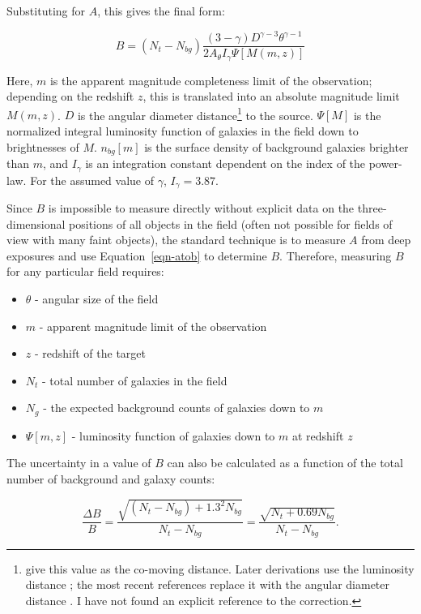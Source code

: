 \documentclass{emulateapj}
\begin{document}
Substituting for $A$, this gives the final form:

\begin{equation}
\label{eqn-bgb}
B = (N_t - N_{bg})\frac{(3-\gamma) D^{\gamma-3} \theta^{\gamma-1}}{2 A_\theta I_\gamma \Psi[M(m,z)]}
\end{equation}

\noindent Here, $m$ is the apparent magnitude completeness limit of the observation; depending on the redshift $z$, this is translated into an absolute magnitude limit $M(m,z)$. $D$ is the angular diameter distance\footnote{\citet{lon79} give this value as the co-moving distance. Later derivations use the luminosity distance \citep[eg,][]{yee87,ell91}; the most recent references replace it with the angular diameter distance \citep{yee99,muz07,zau07}. I have not found an explicit reference to the correction.} to the source. $\Psi[M]$ is the normalized integral luminosity function of galaxies in the field down to brightnesses of $M$. $n_{bg}[m]$ is the surface density of background galaxies brighter than $m$, and $I_\gamma$ is an integration constant dependent on the index of the power-law. For the assumed value of $\gamma$, $I_\gamma=3.87$.  

Since $B$ is impossible to measure directly without explicit data on the three-dimensional positions of all objects in the field (often not possible for fields of view with many faint objects), the standard technique is to measure $A$ from deep exposures and use Equation~\ref{eqn-atob} to determine $B$. Therefore, measuring $B$ for any particular field requires:

\begin{itemize}
    \item $\theta$ - angular size of the field
    \item $m$ - apparent magnitude limit of the observation
    \item $z$ - redshift of the target
    \item $N_t$ - total number of galaxies in the field
    \item $N_g$ - the expected background counts of galaxies down to $m$
    \item $\Psi[m,z]$ - luminosity function of galaxies down to $m$ at redshift $z$
\end{itemize}

The uncertainty in a value of $B$ can also be calculated as a function of the total number of background and galaxy counts:

\begin{equation}
\label{eqn-deltab}
\frac{\Delta B}{B} = \frac{\sqrt{(N_t - N_{bg}) + 1.3^2 N_{bg}}}{N_t - N_{bg}} = \frac{\sqrt{N_t + 0.69 N_{bg}}}{N_t - N_{bg}}.
\end{equation}
\end{document}
